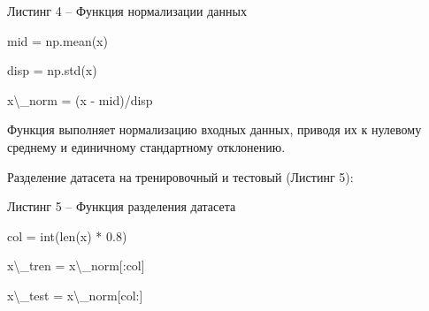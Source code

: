 \documentclass{article}%
\begin{document}
\begin{enumerate}
\begin{flushleft}
\end{flushleft}%
\begin{flushleft}%
Листинг 4 – Функция нормализации данных%
%
\end{flushleft}%
\begin{flushleft}%
mid = np.mean(x)%
%
\end{flushleft}%
\begin{flushleft}%
disp = np.std(x)%
%
\end{flushleft}%
\begin{flushleft}%
x\textbackslash{}_norm = (x - mid)/disp%
%
\end{flushleft}%
\begin{flushleft}%
Функция выполняет нормализацию входных данных, приводя их к нулевому среднему и единичному стандартному отклонению. %
%
\end{flushleft}%
\begin{flushleft}%
Разделение датасета на тренировочный и тестовый (Листинг 5):%
%
\end{flushleft}%
\begin{flushleft}%
Листинг 5 – Функция разделения датасета%
%
\end{flushleft}%
\begin{flushleft}%
col = int(len(x) * 0.8)%
%
\end{flushleft}%
\begin{flushleft}%
x\textbackslash{}_tren = x\textbackslash{}_norm[:col]%
%
\end{flushleft}%
\begin{flushleft}%
x\textbackslash{}_test = x\textbackslash{}_norm[col:]%
%
\end{flushleft}%
\begin{flushleft}%

\end{flushleft}
\end{enumerate}
\end{document}
